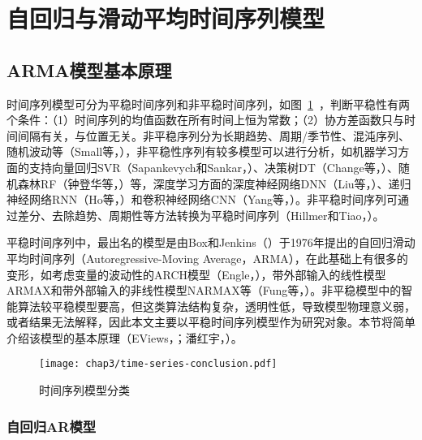 \section{自回归与滑动平均时间序列模型}

\subsection{ARMA模型基本原理}

时间序列模型可分为平稳时间序列和非平稳时间序列，如图~\ref{fig:时间序列模型分类}~，判断平稳性有两个条件：（1）时间序列的均值函数在所有时间上恒为常数；（2）协方差函数只与时间间隔有关，与位置无关。非平稳序列分为长期趋势、周期/季节性、混沌序列、随机波动等（Small等，\citeyear{small2009transforming}），非平稳性序列有较多模型可以进行分析，如机器学习方面的支持向量回归SVR（Sapankevych和Sankar，\citeyear{sapankevych2009time}）、决策树DT（Change等，\citeyear{chang2011trend}）、随机森林RF（钟登华等，\citeyear{钟登华2018基于混沌时序}）等，深度学习方面的深度神经网络DNN（Liu等，\citeyear{liu2014deep}）、递归神经网络RNN（Ho等，\citeyear{ho2002comparative}）和卷积神经网络CNN（Yang等，\citeyear{yang2015deep}）。非平稳时间序列可通过差分、去除趋势、周期性等方法转换为平稳时间序列（Hillmer和Tiao，\citeyear{hillmer1982arima}）。

平稳时间序列中，最出名的模型是由Box和Jenkins（\citeyear{box2015time}）于1976年提出的自回归滑动平均时间序列（Autoregressive-Moving Average，ARMA），在此基础上有很多的变形，如考虑变量的波动性的ARCH模型（Engle，\citeyear{engle1982autoregressive}），带外部输入的线性模型ARMAX和带外部输入的非线性模型NARMAX等（Fung等，\citeyear{fung2003modelling}）。非平稳模型中的智能算法较平稳模型要高，但这类算法结构复杂，透明性低，导致模型物理意义弱，或者结果无法解释，因此本文主要以平稳时间序列模型作为研究对象。本节将简单介绍该模型的基本原理（EViews，\citeyear{noble2011eviews}；潘红宇，\citeyear{cryer2011时间序列分析及应用}）。

\begin{figure}[htb!]
    \centering
    \texttt{[image: chap3/time-series-conclusion.pdf]}
    \caption{时间序列模型分类}
    \label{fig:时间序列模型分类}
\end{figure}

\subsubsection{自回归AR模型}

